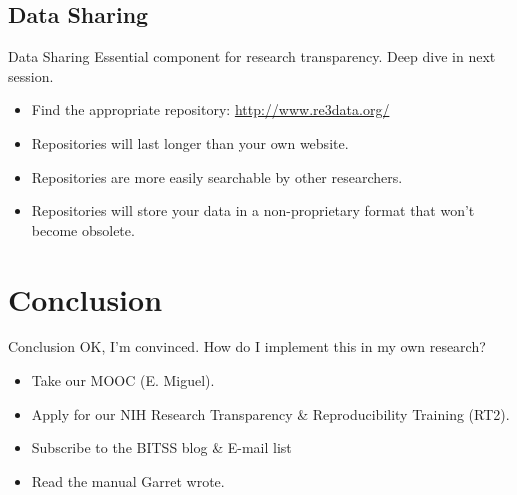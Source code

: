 \documentclass{beamer}
\begin{document}
\subsection*{Data Sharing}
\begin{frame}{Data Sharing}
Essential component for research transparency. Deep dive in next session. 
\begin{itemize}[<.->]
\item
Find the appropriate repository: \url{http://www.re3data.org/}
\item
Repositories will last longer than your own website.
\item
Repositories are more easily searchable by other researchers.
\item
Repositories will store your data in a non-proprietary format that won't become obsolete.
\end{itemize}
\end{frame}

\section{Conclusion}
\begin{frame}{Conclusion}
OK, I'm convinced. How do I implement this in my own research?

\begin{itemize}[<.->]
\item Take our MOOC (E. Miguel).\href{https://www.futurelearn.com/courses/open-social-science-research}{}
\item Apply for our NIH Research Transparency \& Reproducibility Training (RT2). \href{http://www.bitss.org/events/summer-institute/}{}
\item Subscribe to the BITSS blog \& E-mail list \href{https://bitss.org/blog}{}
\item Read the manual Garret wrote.\href{https://github.com/garretchristensen/BestPracticesManual}{}

\end{itemize}
\end{frame}
\end{document}
